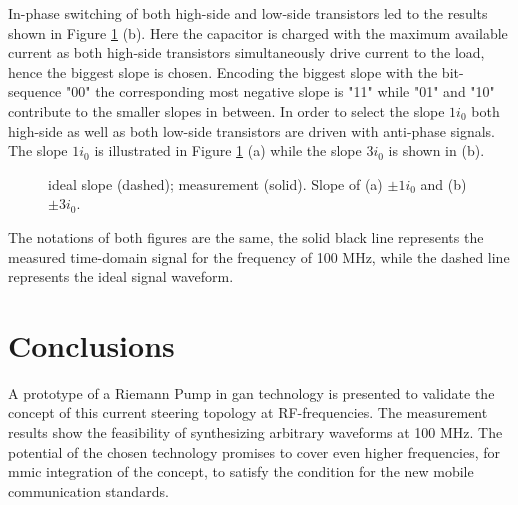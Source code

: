 \documentclass[journal]{IEEEtran}
\begin{document}
In-phase switching of both high-side and low-side transistors led to the results shown in Figure \ref{fig:meas_Output_CLoad_100M_1io_3io} (b).
Here the capacitor is charged with the maximum available current as both high-side transistors simultaneously drive current to the load, hence the biggest slope is chosen.
Encoding the biggest slope with the bit-sequence "00" the corresponding most negative slope is "11" while "01" and "10" contribute to the smaller slopes in between.
In order to select the slope $1 i_0$ both high-side as well as both low-side transistors are driven with anti-phase signals.
The slope $1 i_0$ is illustrated in Figure \ref{fig:meas_Output_CLoad_100M_1io_3io} (a) while the slope $3 i_0$ is shown in (b).
%
\begin{figure}[htb]
  \centering
	\begin{scriptsize}
  	\def\svgwidth{\columnwidth}
 	 
  	\caption{ideal slope (dashed); measurement (solid). Slope of (a) $\pm 1  i_0$ and (b) $\pm 3 i_0$.}
  	\label{fig:meas_Output_CLoad_100M_1io_3io}
	\end{scriptsize}
\end{figure}

The notations of both figures are the same, the solid black line represents the measured time-domain signal for the frequency of 100 MHz, while the dashed line represents the ideal signal waveform.

\section{Conclusions}
\label{sec:conclusion}
A prototype of a Riemann Pump in \gls{gan} technology is presented to validate the concept of this current steering topology at RF-frequencies.
The measurement results show the feasibility of synthesizing arbitrary waveforms at 100 MHz.
The potential of the chosen technology promises to cover even higher frequencies, for \gls{mmic} integration 
of the concept, to satisfy the condition for the new mobile communication standards.
\end{document}
